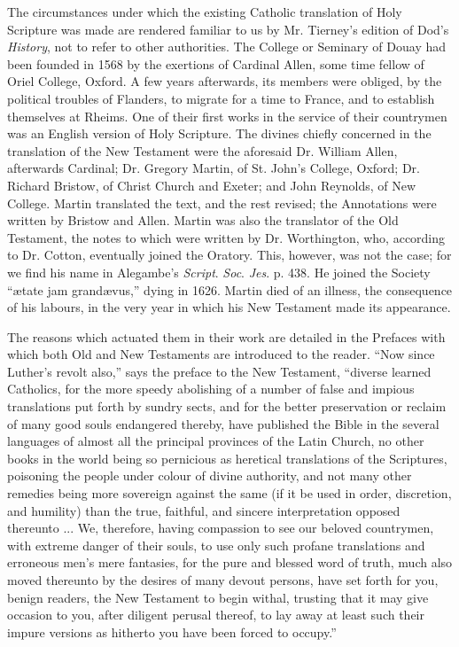 The circumstances under which the existing Catholic translation of
Holy Scripture was made are rendered familiar to us by Mr. Tierney's
edition of Dod's \emph{History}, not to refer to other authorities.
The College or Seminary of Douay had been founded in 1568 by the
exertions of Cardinal Allen, some time fellow of Oriel College,
Oxford. A few years afterwards, its members were obliged, by the
political troubles of Flanders, to migrate for a time to France, and
to establish themselves at Rheims. One of their first works in the
service of their countrymen was an English version of Holy Scripture.
The divines chiefly concerned in the translation of the New Testament
were the aforesaid Dr. William Allen, afterwards Cardinal; Dr. Gregory
Martin, of St. John's College, Oxford; Dr. Richard Bristow, of Christ
Church and Exeter; and John Reynolds, of New College. Martin
translated the text, and the rest revised; the Annotations were
written by Bristow and Allen. Martin was also the translator of the
Old Testament, the notes to which were written by Dr. Worthington,
who, according to Dr. Cotton, eventually joined the Oratory. This,
however, was not the case; for we find his name in Alegambe's \emph{Script}.
\emph{Soc}. \emph{Jes}. p. 438. He joined the Society ``ætate jam
grandævus,'' dying in 1626. Martin died of an illness, the
consequence of his labours, in the very year in which his New
Testament made its appearance.

The reasons which actuated them in their work are detailed in the
Prefaces with which both Old and New Testaments are introduced to the
reader. ``Now since Luther's revolt also,'' says the preface
to the New Testament, ``diverse learned Catholics, for the more
speedy abolishing of a number of false and impious translations put
forth by sundry sects, and for the better preservation or reclaim of
many good souls endangered thereby, have published the Bible in the
several languages of almost all the principal provinces of the Latin
Church, no other books in the world being so pernicious as heretical
translations of the Scriptures, poisoning the people under
colour of divine authority, and not many other remedies being more
sovereign against the same (if it be used in order, discretion, and
humility) than the true, faithful, and sincere interpretation opposed
thereunto ... We, therefore, having compassion to see our beloved
countrymen, with extreme danger of their souls, to use only such
profane translations and erroneous men's mere fantasies, for the pure
and blessed word of truth, much also moved thereunto by the desires of
many devout persons, have set forth for you, benign readers, the New
Testament to begin withal, trusting that it may give occasion to you,
after diligent perusal thereof, to lay away at least such their impure
versions as hitherto you have been forced to occupy.''

